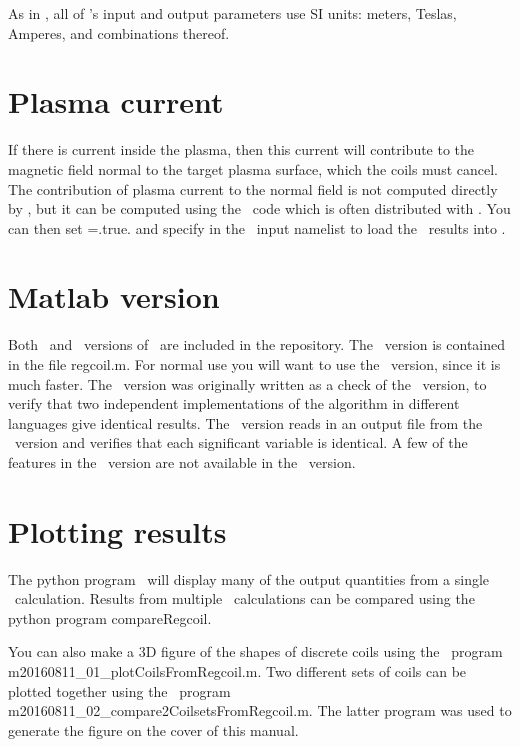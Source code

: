 As in \vmec, all of \regcoil's input and output parameters use SI units: meters, Teslas, Amperes, and combinations thereof.

\section{Plasma current}

If there is current inside the plasma, then this current will contribute to the magnetic field normal
to the target plasma surface, which the coils must cancel. The contribution of plasma current to the normal field
is not computed directly by \regcoil, but it can be computed using the \bnorm~code which is 
often distributed with \vmec.  You can then set ={\ttfamily .true.} and specify 
in the \regcoil~input namelist to load the \bnorm~results into \regcoil.

\section{Matlab version}

Both \fortran~and \matlab~versions of \regcoil~are included in the repository.  The \matlab~version is
contained in the file {\ttfamily regcoil.m}. For normal
use you will want to use the \fortran~version, since it is much faster.  The \matlab~version was originally
written as a check of the \fortran~version, to verify that two independent implementations of the algorithm
in different languages give identical results.  The \matlab~version reads in an output file from the \fortran~version
and verifies that each significant variable is identical.  A few of the features in the \fortran~version
are not available in the \matlab~version.

\section{Plotting results}

The python program \regcoilPlot~will display many of the output quantities from a single \regcoil~calculation.
Results from multiple \regcoil~calculations can be compared using the python program {\ttfamily compareRegcoil}.

You can also make a 3D figure of the shapes of discrete coils using the \matlab~program {\ttfamily m20160811\_01\_plotCoilsFromRegcoil.m}.
Two different sets of coils can be plotted together using the \matlab~program {\ttfamily m20160811\_02\_compare2CoilsetsFromRegcoil.m}.
The latter program was used to generate the figure on the cover of this manual.

